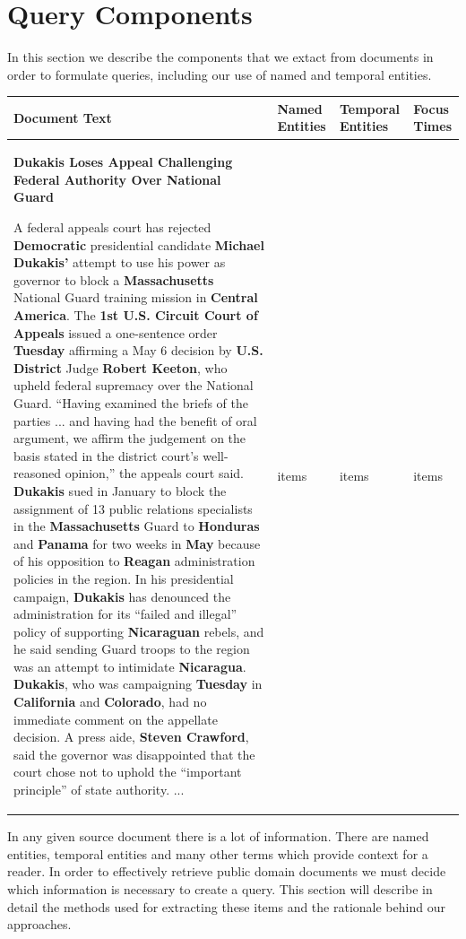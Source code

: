 \documentclass{mpaper}
\begin{document}
\section{Query Components} \label{sec:components}
In this section we describe the components that we extact from documents in order to formulate queries, including our use of named and temporal entities.
\begin{table}[t]
\centering
\begin{tabular}{|p{8cm}|p{2cm}|p{2cm}|p{2cm}|}
\hline
Document Text & Named Entities  & Temporal Entities & Focus Times  \\ \hline
\textbf{Dukakis Loses Appeal Challenging Federal Authority Over National
Guard}

   A federal appeals court has rejected \textbf{Democratic} presidential candidate \textbf{Michael Dukakis'} attempt to use his power as governor to block a \textbf{Massachusetts} National Guard training mission in \textbf{Central America}.
   The \textbf{1st U.S. Circuit Court of Appeals} issued a one-sentence order \textbf{Tuesday} affirming a May 6 decision by \textbf{U.S. District} Judge \textbf{Robert Keeton}, who upheld federal supremacy over the National Guard.
   ``Having examined the briefs of the parties ... and having had the benefit of oral argument, we affirm the judgement on the basis stated in the district court's well-reasoned opinion,'' the appeals court said.
   \textbf{Dukakis} sued in January to block the assignment of 13 public relations specialists in the \textbf{Massachusetts} Guard to \textbf{Honduras} and \textbf{Panama} for two weeks in \textbf{May} because of his opposition to \textbf{Reagan} administration policies in the region.
   In his presidential campaign, \textbf{Dukakis} has denounced the administration for its ``failed and illegal'' policy of supporting \textbf{Nicaraguan} rebels, and he said sending Guard troops to the region was an attempt to intimidate \textbf{Nicaragua}.
   \textbf{Dukakis}, who was campaigning \textbf{Tuesday} in \textbf{California} and \textbf{Colorado}, had no immediate comment on the appellate decision. A press aide, \textbf{Steven Crawford}, said the governor was disappointed that the court chose not to uphold the ``important principle'' of state authority. ...
& items
& items
& items
\\ \hline
\end{tabular}
\end{table}
In any given source document there is a lot of information. There are named entities, temporal entities and many other terms which provide context for a reader.
In order to effectively retrieve public domain documents we must decide which information is necessary to create a query. 
This section will describe in detail the methods used for extracting these items and the rationale behind our approaches.
\end{document}
